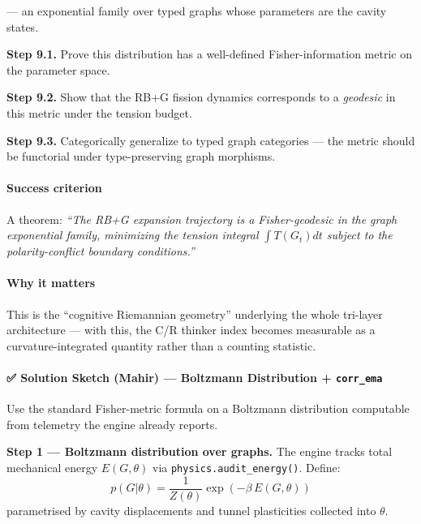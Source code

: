 \documentclass[
  11pt,
  a4paper,
]{article}
\begin{document}
--- an exponential family over typed graphs whose parameters are the
cavity states.

\textbf{Step 9.1.} Prove this distribution has a well-defined
Fisher-information metric on the parameter space.

\textbf{Step 9.2.} Show that the RB+G fission dynamics corresponds to a
\emph{geodesic} in this metric under the tension budget.

\textbf{Step 9.3.} Categorically generalize to typed graph categories
--- the metric should be functorial under type-preserving graph
morphisms.

\paragraph{Success criterion}\label{success-criterion-8}

A theorem: \emph{``The RB+G expansion trajectory is a Fisher-geodesic in
the graph exponential family, minimizing the tension integral
\(\int T(G_t) dt\) subject to the polarity-conflict boundary
conditions.''}

\paragraph{Why it matters}\label{why-it-matters-1}

This is the ``cognitive Riemannian geometry'' underlying the whole
tri-layer architecture --- with this, the C/R thinker index becomes
measurable as a curvature-integrated quantity rather than a counting
statistic.

\paragraph{\texorpdfstring{✅ Solution Sketch (Mahir) --- Boltzmann
Distribution +
\texttt{corr\_ema}}{✅ Solution Sketch (Mahir) --- Boltzmann Distribution + corr\_ema}}\label{solution-sketch-mahir-boltzmann-distribution-corr_ema}

Use the standard Fisher-metric formula on a Boltzmann distribution
computable from telemetry the engine already reports.

\textbf{Step 1 --- Boltzmann distribution over graphs.} The engine
tracks total mechanical energy \(E(G, \theta)\) via
\texttt{physics.audit\_energy()}. Define: \[
p(G | \theta) = \frac{1}{Z(\theta)} \exp\!\left(-\beta \, E(G, \theta)\right)
\] parametrised by cavity displacements and tunnel plasticities
collected into \(\theta\).
\end{document}
